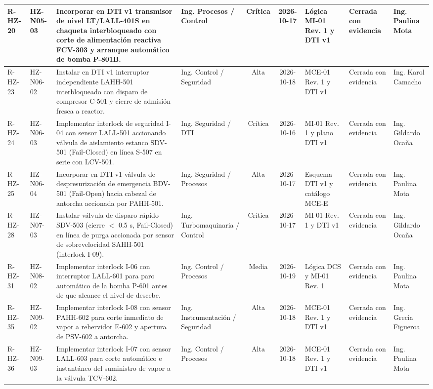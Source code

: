 \documentclass[10pt,letterpaper]{article}
\begin{document}
\begin{table}[H]
\begin{tabularx}{\textwidth}{|l|l|X|p{2.6cm}|c|c|p{2.6cm}|p{1.8cm}|p{2.2cm}|}
R-HZ-20 & HZ-N05-03 & Incorporar en DTI v1 transmisor de nivel LT/LALL-401S en chaqueta interbloqueado con corte de alimentación reactiva FCV-303 y arranque automático de bomba P-801B. & Ing. Procesos / Control & Crítica & 2026-10-17 & Lógica MI-01 Rev. 1 y DTI v1 & Cerrada con evidencia & Ing. Paulina Mota \\ \hline
R-HZ-23 & HZ-N06-02 & Instalar en DTI v1 interruptor independiente LAHH-501 interbloqueado con disparo de compresor C-501 y cierre de admisión fresca a reactor. & Ing. Control / Seguridad & Alta & 2026-10-18 & MCE-01 Rev. 1 y DTI v1 & Cerrada con evidencia & Ing. Karol Camacho \\ \hline
R-HZ-24 & HZ-N06-03 & Implementar interlock de seguridad I-04 con sensor LALL-501 accionando válvula de aislamiento estanco SDV-501 (Fail-Closed) en línea S-507 en serie con LCV-501. & Ing. Seguridad / DTI & Crítica & 2026-10-16 & MI-01 Rev. 1 y plano DTI v1 & Cerrada con evidencia & Ing. Gildardo Ocaña \\ \hline
R-HZ-25 & HZ-N06-04 & Incorporar en DTI v1 válvula de despresurización de emergencia BDV-501 (Fail-Open) hacia cabezal de antorcha accionada por PAHH-501. & Ing. Seguridad / Procesos & Alta & 2026-10-17 & Esquema DTI v1 y catálogo MCE-E & Cerrada con evidencia & Ing. Paulina Mota \\ \hline
R-HZ-28 & HZ-N07-03 & Instalar válvula de disparo rápido SDV-503 (cierre $<$ 0.5 s, Fail-Closed) en línea de purga accionada por sensor de sobrevelocidad SAHH-501 (interlock I-09). & Ing. Turbomaquinaria / Control & Crítica & 2026-10-17 & MI-01 Rev. 1 y DTI v1 & Cerrada con evidencia & Ing. Gildardo Ocaña \\ \hline
R-HZ-31 & HZ-N08-02 & Implementar interlock I-06 con interruptor LALL-601 para paro automático de la bomba P-601 antes de que alcance el nivel de descebe. & Ing. Control / Procesos & Media & 2026-10-19 & Lógica DCS y MI-01 Rev. 1 & Cerrada con evidencia & Ing. Paulina Mota \\ \hline
R-HZ-35 & HZ-N09-02 & Implementar interlock I-08 con sensor PAHH-602 para corte inmediato de vapor a rehervidor E-602 y apertura de PSV-602 a antorcha. & Ing. Instrumentación / Seguridad & Alta & 2026-10-18 & MCE-01 Rev. 1 y DTI v1 & Cerrada con evidencia & Ing. Grecia Figueroa \\ \hline
R-HZ-36 & HZ-N09-03 & Implementar interlock I-07 con sensor LALL-603 para corte automático e instantáneo del suministro de vapor a la válvula TCV-602. & Ing. Control / Procesos & Alta & 2026-10-18 & MCE-01 Rev. 1 y DTI v1 & Cerrada con evidencia & Ing. Paulina Mota \\ \hline
\end{tabularx}
\end{table}
\newpage
\end{document}
